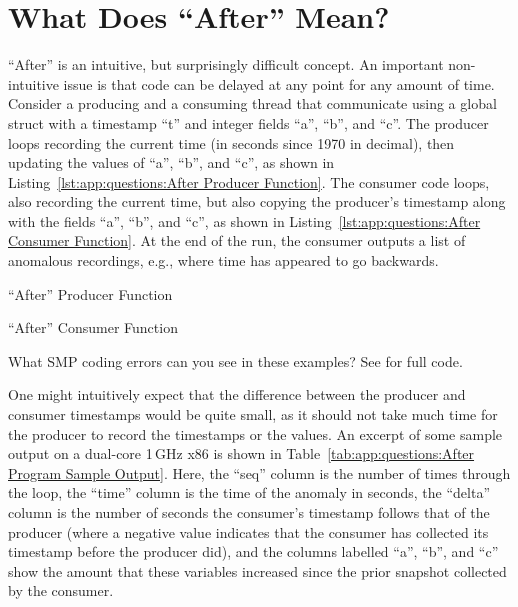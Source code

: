 
\section{What Does ``After'' Mean?}
\label{sec:app:questions:What Does ``After'' Mean?}

``After'' is an intuitive, but surprisingly difficult concept.
An important non-intuitive issue is that code can be delayed at
any point for any amount of time.
Consider a producing and a consuming thread that communicate using
a global struct with a timestamp ``t'' and integer fields ``a'', ``b'',
and ``c''.
The producer loops recording the current time
(in seconds since 1970 in decimal),
then updating the values of ``a'', ``b'', and ``c'',
as shown in Listing~\ref{lst:app:questions:After Producer Function}.
The consumer code loops, also recording the current time, but also
copying the producer's timestamp along with the fields ``a'',
``b'', and ``c'', as shown in
Listing~\ref{lst:app:questions:After Consumer Function}.
At the end of the run, the consumer outputs a list of anomalous recordings,
e.g., where time has appeared to go backwards.

\begin{listing}[htbp]

\caption{``After'' Producer Function}
\label{lst:app:questions:After Producer Function}
\end{listing}

\begin{listing}[htbp]

\caption{``After'' Consumer Function}
\label{lst:app:questions:After Consumer Function}
\end{listing}

\QuickQuiz{}
	What SMP coding errors can you see in these examples?
	See  for full code.
 \QuickQuizEnd

One might intuitively expect that the difference between the producer
and consumer timestamps would be quite small, as it should not take
much time for the producer to record the timestamps or the values.
An excerpt of some sample output on a dual-core 1\,GHz x86 is shown in
Table~\ref{tab:app:questions:After Program Sample Output}.
Here, the ``seq'' column is the number of times through the loop,
the ``time'' column is the time of the anomaly in seconds, the ``delta''
column is the number of seconds the consumer's timestamp follows that
of the producer (where a negative value indicates that the consumer
has collected its timestamp before the producer did), and the
columns labelled ``a'', ``b'', and ``c'' show the amount that these
variables increased since the prior snapshot collected by the consumer.

